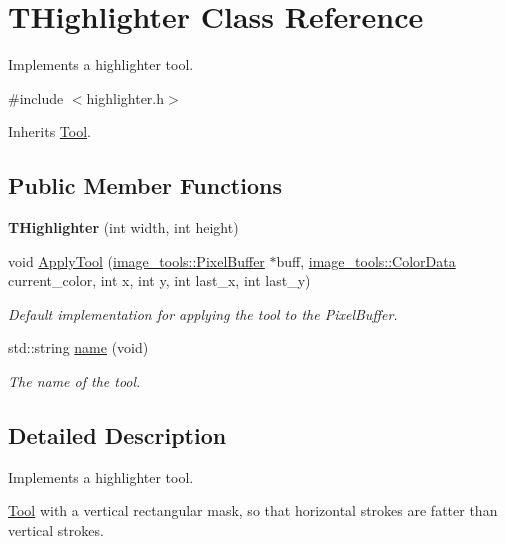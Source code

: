 \hypertarget{classTHighlighter}{}\section{T\+Highlighter Class Reference}
\label{classTHighlighter}


Implements a highlighter tool.  




{\ttfamily \#include $<$highlighter.\+h$>$}



Inherits \hyperlink{classTool}{Tool}.

\subsection*{Public Member Functions}
\begin{DoxyCompactItemize}
\item 
{\bfseries T\+Highlighter} (int width, int height)\hypertarget{classTHighlighter_ae261eea32cbe5c0d2df91d3442b41571}{}\label{classTHighlighter_ae261eea32cbe5c0d2df91d3442b41571}

\item 
void \hyperlink{classTHighlighter_a2fdc00984b60b7b26866888f2f9f766d}{Apply\+Tool} (\hyperlink{classimage__tools_1_1PixelBuffer}{image\+\_\+tools\+::\+Pixel\+Buffer} $\ast$buff, \hyperlink{classimage__tools_1_1ColorData}{image\+\_\+tools\+::\+Color\+Data} current\+\_\+color, int x, int y, int last\+\_\+x, int last\+\_\+y)
\begin{DoxyCompactList}\small\item\em Default implementation for applying the tool to the Pixel\+Buffer. \end{DoxyCompactList}\item 
std\+::string \hyperlink{classTHighlighter_a60d8b5d4d24b73a06f052e9e3f1f4e90}{name} (void)
\begin{DoxyCompactList}\small\item\em The name of the tool. \end{DoxyCompactList}\end{DoxyCompactItemize}


\subsection{Detailed Description}
Implements a highlighter tool. 

\hyperlink{classTool}{Tool} with a vertical rectangular mask, so that horizontal strokes are fatter than vertical strokes. 

